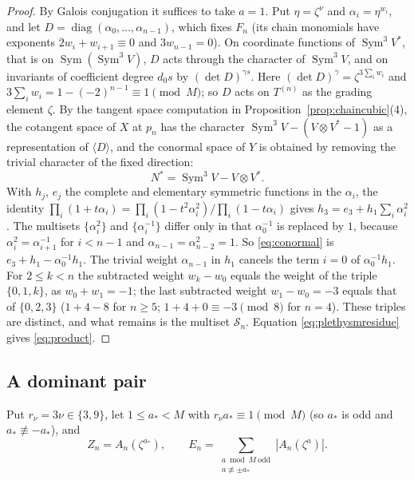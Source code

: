 \documentclass[11pt,a4paper]{article}
\theoremstyle{definition}
\newcommand{\Sym}{\operatorname{Sym}}
\newcommand{\diag}{\operatorname{diag}}
\begin{document}
\begin{proof}
By Galois conjugation it suffices to take $a=1$. Put $\eta=\zeta^\nu$ and
$\alpha_i=\eta^{w_i}$, and let $D=\diag(\alpha_0,\dots,\alpha_{n-1})$, which
fixes $F_n$ (its chain monomials have exponents $2w_i+w_{i+1}\equiv0$ and
$3w_{n-1}=0$). On coordinate functions of $\Sym^3V^*$, that is on
$\Sym(\Sym^3V)$, $D$ acts through the character of $\Sym^3V$, and on invariants
of coefficient degree $d_0s$ by $(\det D)^{\gamma s}$. Here
$(\det D)^\gamma=\zeta^{3\sum_iw_i}$ and $3\sum_iw_i=1-(-2)^{n-1}\equiv1
\pmod M$; so $D$ acts on $T^{(n)}$ as the grading element $\zeta$. By the
tangent space computation in Proposition~\ref{prop:chaincubic}(4), the
cotangent space of $X$ at $p_n$ has the character $\Sym^3V-(V\otimes V^*-1)$
as a representation of $\langle D\rangle$, and the conormal space of $Y$ is
obtained by removing the trivial character of the fixed direction:
\begin{equation}\label{eq:conormal}
 N^*=\Sym^3V-V\otimes V^* .
\end{equation}
With $h_j$, $e_j$ the complete and elementary symmetric functions in the
$\alpha_i$, the identity $\prod_i(1+t\alpha_i)=\prod_i(1-t^2\alpha_i^2)/
\prod_i(1-t\alpha_i)$ gives $h_3=e_3+h_1\sum_i\alpha_i^2$. The multisets
$\{\alpha_i^2\}$ and $\{\alpha_i^{-1}\}$ differ only in that $\alpha_0^{-1}$ is
replaced by $1$, because $\alpha_i^2=\alpha_{i+1}^{-1}$ for $i<n-1$ and
$\alpha_{n-1}=\alpha_{n-2}^2=1$. So \eqref{eq:conormal} is
$e_3+h_1-\alpha_0^{-1}h_1$. The trivial weight $\alpha_{n-1}$ in $h_1$ cancels
the term $i=0$ of $\alpha_0^{-1}h_1$. For $2\le k<n$ the subtracted weight
$w_k-w_0$ equals the weight of the triple $\{0,1,k\}$, as $w_0+w_1=-1$; the
last subtracted weight $w_1-w_0=-3$ equals that of $\{0,2,3\}$ ($1+4-8$ for
$n\ge5$; $1+4+0\equiv-3\pmod8$ for $n=4$). These triples are distinct, and what
remains is the multiset $\mathcal S_n$. Equation \eqref{eq:plethysmresidue}
gives \eqref{eq:product}.
\end{proof}

\subsection{A dominant pair}

Put $r_\nu=3\nu\in\{3,9\}$, let $1\le a_*<M$ with $r_\nu a_*\equiv1\pmod M$
(so $a_*$ is odd and $a_*\not\equiv-a_*$), and
\begin{equation}\label{eq:ZE}
 Z_n=A_n(\zeta^{a_*}),\qquad
 E_n=\sum_{\substack{a\bmod M\ \mathrm{odd}\\a\not\equiv\pm a_*}}|A_n(\zeta^a)| .
\end{equation}
\end{document}

